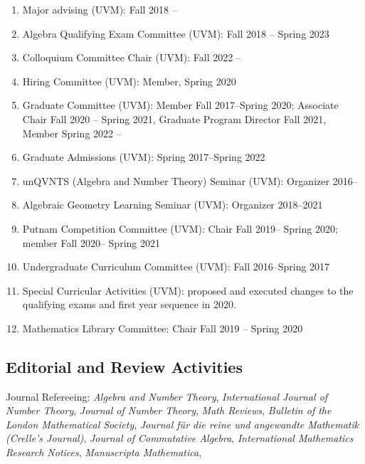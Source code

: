 \documentclass[a4paper,10pt]{article}
\begin{document}
\begin{enumerate}
	\item Major advising (UVM): Fall 2018 --
	\item Algebra Qualifying Exam Committee (UVM): Fall 2018 -- Spring 2023
	\item Colloquium Committee Chair (UVM): Fall 2022 --
	\item Hiring Committee (UVM): Member, Spring 2020
	\item Graduate Committee (UVM): Member Fall 2017--Spring 2020; Associate Chair Fall 2020 -- Spring 2021, Graduate Program Director Fall 2021, Member Spring 2022 -- 
	\item Graduate Admissions (UVM): Spring 2017--Spring 2022
	\item unQVNTS (Algebra and Number Theory) Seminar (UVM): Organizer 2016--
	\item Algebraic Geometry Learning Seminar (UVM): Organizer 2018--2021
	\item Putnam Competition Committee (UVM): Chair Fall 2019-- Spring 2020; member Fall 2020-- Spring 2021
	\item Undergraduate Curriculum Committee (UVM): Fall 2016--Spring 2017 
	\item Special Curricular Activities (UVM): proposed and executed changes to the qualifying exams and first year sequence in 2020. 
	\item Mathematics Library Committee:  Chair Fall 2019 -- Spring 2020
\end{enumerate}

\subsection*{Editorial and Review Activities}
Journal Refereeing: \emph{Algebra and Number Theory}, \emph{International Journal of Number Theory}, \emph{Journal of Number Theory}, \emph{Math Reviews}, \emph{Bulletin of the London Mathematical Society},  \emph{Journal für die reine und angewandte Mathematik (Crelle’s Journal)}, \emph{Journal of Commutative Algebra}, \emph{International Mathematics Research Notices}, \emph{Manuscripta Mathematica}, \emph{}
\end{document}
